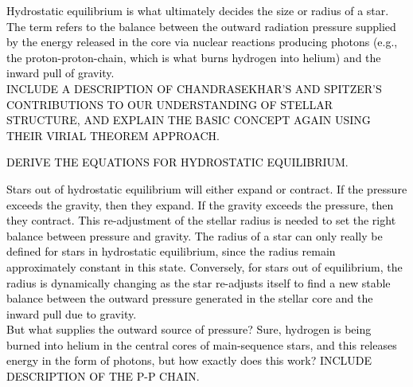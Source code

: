 \documentclass[main.tex]{subfiles}
\begin{document}
\begin{tcolorbox}[sharp corners, colback=blue!30, colframe=blue!80!blue, title=Box \refstepcounter{educhap1}\label{boxchap1:he!}\ref{boxchap1:he1} -- Hydrostatic Equilibrium I]
\par \textcolor{black} {Hydrostatic equilibrium is what ultimately decides the size or radius of a star.  The term refers to the balance between the outward radiation pressure supplied by the energy released in the core via nuclear reactions producing photons (e.g., the proton-proton-chain, which is what burns hydrogen into helium) and the inward pull of gravity. \\
INCLUDE A DESCRIPTION OF CHANDRASEKHAR'S AND SPITZER'S CONTRIBUTIONS TO OUR UNDERSTANDING OF STELLAR STRUCTURE, AND EXPLAIN THE BASIC CONCEPT AGAIN USING THEIR VIRIAL THEOREM APPROACH.}
\end{tcolorbox}

\begin{tcolorbox}[sharp corners, colback=green!30, colframe=green!80!blue, title=Box \refstepcounter{educhap1}\label{boxchap1:he2}\ref{boxchap1:he2} -- Hdrostatic Equilibrium II]
\par \textcolor{black} {DERIVE THE EQUATIONS FOR HYDROSTATIC EQUILIBRIUM.}
\end{tcolorbox}

\begin{tcolorbox}[sharp corners, colback=green!30, colframe=green!80!blue, title=Box \refstepcounter{educhap1}\label{boxchap1:radius}\ref{boxchap1:radius} -- What determines the radius of a star?]
\par \textcolor{black} {Stars out of hydrostatic equilibrium will either expand or contract.  If the pressure exceeds the gravity, then they expand.  If the gravity exceeds the pressure, then they contract.  This re-adjustment of the stellar radius is needed to set the right balance between pressure and gravity.  The radius of a star can only really be defined for stars in hydrostatic equilibrium, since the radius remain approximately constant in this state.  Conversely, for stars out of equilibrium, the radius is dynamically changing as the star re-adjusts itself to find a new stable balance between the outward pressure generated in the stellar core and the inward pull due to gravity. \\
But what supplies the outward source of pressure?  Sure, hydrogen is being burned into helium in the central cores of main-sequence stars, and this releases energy in the form of photons, but how exactly does this work?  INCLUDE DESCRIPTION OF THE P-P CHAIN.}
\end{tcolorbox}
\end{document}
